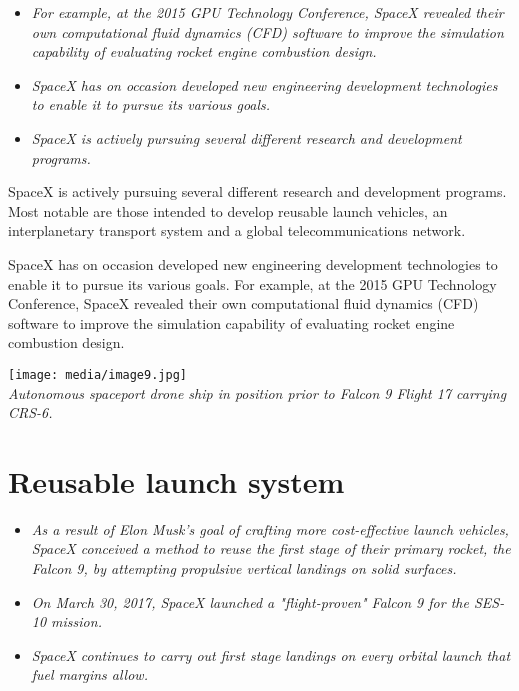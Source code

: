 \begin{itemize}
\item
  \emph{For example, at the 2015 GPU Technology Conference, SpaceX
  revealed their own computational fluid dynamics (CFD) software to
  improve the simulation capability of evaluating rocket engine
  combustion design.}
\item
  \emph{SpaceX has on occasion developed new engineering development
  technologies to enable it to pursue its various goals.}
\item
  \emph{SpaceX is actively pursuing several different research and
  development programs.}
\end{itemize}

SpaceX is actively pursuing several different research and development
programs. Most notable are those intended to develop reusable launch
vehicles, an interplanetary transport system and a global
telecommunications network.

SpaceX has on occasion developed new engineering development
technologies to enable it to pursue its various goals. For example, at
the 2015 GPU Technology Conference, SpaceX revealed their own
computational fluid dynamics (CFD) software to improve the simulation
capability of evaluating rocket engine combustion design.

\texttt{[image: media/image9.jpg]}\\
\emph{Autonomous spaceport drone ship in position prior to Falcon 9
Flight 17 carrying CRS-6.}

\section{Reusable launch system}\label{reusable-launch-system}

\begin{itemize}
\item
  \emph{As a result of Elon Musk's goal of crafting more cost-effective
  launch vehicles, SpaceX conceived a method to reuse the first stage of
  their primary rocket, the Falcon 9, by attempting propulsive vertical
  landings on solid surfaces.}
\item
  \emph{On March 30, 2017, SpaceX launched a "flight-proven" Falcon 9
  for the SES-10 mission.}
\item
  \emph{SpaceX continues to carry out first stage landings on every
  orbital launch that fuel margins allow.}
\end{itemize}

